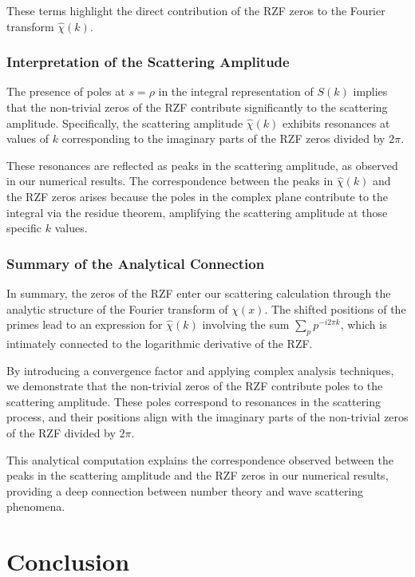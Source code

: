 \documentclass[11pt, oneside]{article}
\begin{document}
These terms highlight the direct contribution of the RZF zeros to the Fourier transform $\hat{\chi}(k)$.

\subsubsection{Interpretation of the Scattering Amplitude}

The presence of poles at $s = \rho$ in the integral representation of $S(k)$ implies that the non-trivial zeros of the RZF contribute significantly to the scattering amplitude. Specifically, the scattering amplitude $\hat{\chi}(k)$ exhibits resonances at values of $k$ corresponding to the imaginary parts of the RZF zeros divided by $2\pi$.

These resonances are reflected as peaks in the scattering amplitude, as observed in our numerical results. The correspondence between the peaks in $\hat{\chi}(k)$ and the RZF zeros arises because the poles in the complex plane contribute to the integral via the residue theorem, amplifying the scattering amplitude at those specific $k$ values.

\subsubsection{Summary of the Analytical Connection}

In summary, the zeros of the RZF enter our scattering calculation through the analytic structure of the Fourier transform of $\chi(x)$. The shifted positions of the primes lead to an expression for $\hat{\chi}(k)$ involving the sum $\sum_{p} p^{-i 2\pi k}$, which is intimately connected to the logarithmic derivative of the RZF.

By introducing a convergence factor and applying complex analysis techniques, we demonstrate that the non-trivial zeros of the RZF contribute poles to the scattering amplitude. These poles correspond to resonances in the scattering process, and their positions align with the imaginary parts of the non-trivial zeros of the RZF divided by $2\pi$.

This analytical computation explains the correspondence observed between the peaks in the scattering amplitude and the RZF zeros in our numerical results, providing a deep connection between number theory and wave scattering phenomena.


\section{Conclusion}
\end{document}
